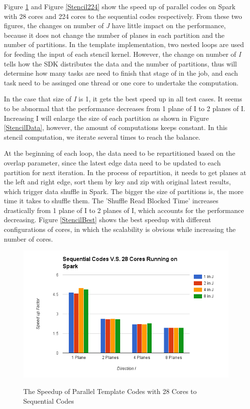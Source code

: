 Figure \ref{Stencil28} and Figure \ref{Stencil224} show the speed up of parallel codes on Spark with 28 cores and 224 cores to the sequential codes respectively. 
From these two figures, the changes on number of \emph{J} have little impact on the performance, because it does not change the number of planes in each partition and the number of partitions. In the template implementation, two nested loops are used for feeding the input of each stencil kernel. However, the change on number of \emph{I} tells how the SDK distributes the data and the number of partitions, thus will determine how many tasks are need to finish that stage of in the job, and each task need to be assinged one thread or one core to undertake the computation.

In the case that size of \emph{I} is 1, it gets the best speed up in all test cases. It seems to be abnormal that the performance decreases from 1 plane of I to 2 planes of I. Increasing I will enlarge the size of each partition as shown in Figure \ref{StencilData}, however, the amount of computations keeps constant. In this stencil computation, we iterate several times to reach the balance. 

At the beginning of each loop, the data need to be repartitioned based on the overlap parameter, since the latest edge data need to be updated to each partition for next iteration. In the process of repartition, it needs to get planes at the left and right edge, sort them by key and zip with original latest results, which trigger data shuffle in Spark. The bigger the size of partitions is, the more time it takes to shuffle them. The 'Shuffle Read Blocked Time' increases drastically from 1 plane of I to 2 planes of I, which accounts for the performance decreasing. 
Figure \ref{StencilBest} shows the best speedup with different configurations of cores, in which the scalability is obvious while increasing the number of cores.

\begin{figure}[h]
\centering
\includegraphics[scale=0.7]{figures/Stencil28.png}\\
\caption{The Speedup of Parallel Template Codes with 28 Cores to Sequential Codes}
\label{Stencil28}
\end{figure}

